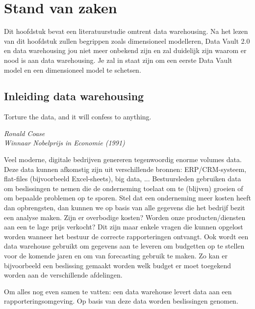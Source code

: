 \chapter{Stand van zaken}
\label{ch:stand-van-zaken}



Dit hoofdstuk bevat een literatuurstudie omtrent data warehousing. Na het lezen van dit hoofdstuk zullen begrippen zoals dimensioneel modelleren, Data Vault 2.0 en data warehousing jou niet meer onbekend zijn en zal duidelijk zijn waarom er nood is aan data warehousing. Je zal in staat zijn om een eerste Data Vault model en een dimensioneel model te schetsen.

\section{Inleiding data warehousing}

\epigraph{Torture the data, and it will confess to anything. }{\textit{Ronald Coase \\ Winnaar Nobelprijs in Economie (1991)}}

Veel moderne, digitale bedrijven genereren tegenwoordig enorme volumes data. Deze data kunnen afkomstig zijn uit verschillende bronnen: ERP/CRM-systeem, flat-files (bijvoorbeeld Excel-sheets), big data, ... Bestuursleden gebruiken data om beslissingen te nemen die de onderneming toelaat om te (blijven) groeien of om bepaalde problemen op te sporen. Stel dat een onderneming meer kosten heeft dan opbrengsten, dan kunnen we op basis van alle gegevens die het bedrijf bezit een analyse maken. Zijn er overbodige kosten? Worden onze producten/diensten aan een te lage prijs verkocht? Dit zijn maar enkele vragen die kunnen opgelost worden wanneer het bestuur de correcte rapporteringen ontvangt. Ook wordt een data warehouse gebruikt om gegevens aan te leveren om budgetten op te stellen voor de komende jaren en om van forecasting gebruik te maken. Zo kan er bijvoorbeeld een beslissing gemaakt worden welk budget er moet toegekend worden aan de verschillende afdelingen. 

Om alles nog even samen te vatten: een data warehouse levert data aan een rapporteringsomgeving. Op basis van deze data worden beslissingen genomen.


